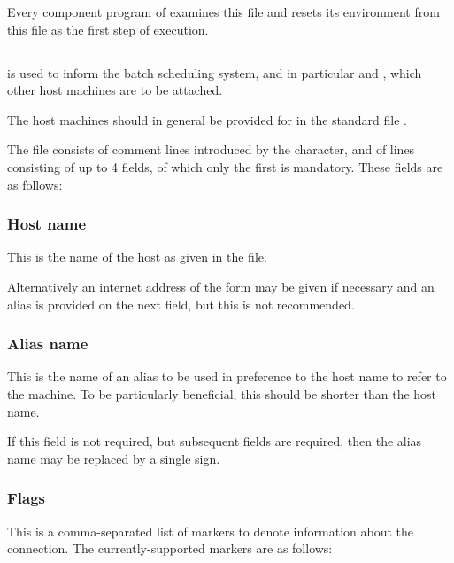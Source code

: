 Every component program of \ProductName{} examines this file and resets its environment from this file as the first step of execution.

\subsection{\hostsfilename}
\hostsfile{} is used to inform the \ProductName{} batch scheduling system, and in particular  and , which other host machines are to be attached.

The host machines should in general be provided for in the standard file .

The file consists of comment lines introduced by the \exampletext{\#} character, and of lines consisting of up to 4
fields, of which only the first is mandatory. These fields are as follows:

\subsubsection{Host name}
This is the name of the host as given in the  file.

Alternatively an internet address of the form  may be given if necessary and an alias is provided on the next field, but this is not recommended.

\subsubsection{Alias name}
This is the name of an alias to be used in preference to the host name to refer to the machine. To be particularly beneficial, this should be
shorter than the host name.

If this field is not required, but subsequent fields are required, then the alias name may be replaced by a single \exampletext{{}-} sign.

\subsubsection{Flags}
This is a comma-separated list of markers to denote information about the connection. The currently-supported markers are as follows:


